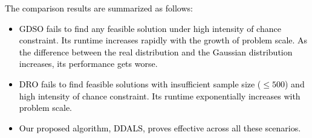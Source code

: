 \documentclass[lettersize,journal]{IEEEtran}
\begin{document}
\begin{table}[!t]
    \caption{\textcolor{black}{DDALS vs GDSO vs DRO comparison 4}}
    \centering
\label{compare:D}
\end{table}


\textcolor{black}{
The comparison results are summarized as follows:
\begin{itemize}
    \item GDSO fails to find any feasible solution under high intensity of chance constraint. Its runtime increases rapidly with the growth of problem scale. 
    As the difference between the real distribution and the Gaussian distribution increases, its performance gets worse.
    \item DRO fails to find feasible solutions with insufficient sample size ($\leq 500$) and high intensity of chance constraint. Its runtime exponentially increases with problem scale.
    \item Our proposed algorithm, DDALS, proves effective across all these scenarios.
\end{itemize}
}
\end{document}
